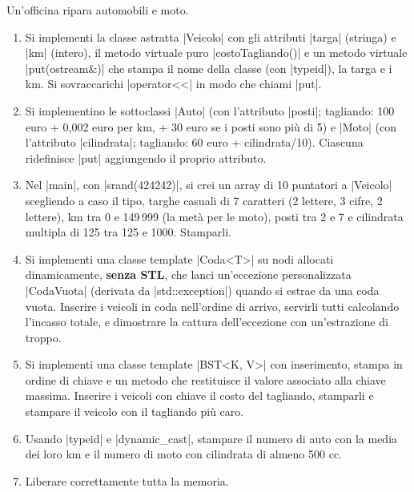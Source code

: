 \begin{traccia}[: L'officina]
Un'officina ripara automobili e moto.
\begin{enumerate}[label=\textbf{\Alph*.}]
  \item Si implementi la classe astratta \cc|Veicolo| con gli attributi \cc|targa|
        (stringa) e \cc|km| (intero), il metodo virtuale puro \cc|costoTagliando()| e un
        metodo virtuale \cc|put(ostream&)| che stampa il nome della classe (con
        \cc|typeid|), la targa e i km. Si sovraccarichi \cc|operator<<| in modo che chiami
        \cc|put|.
  \item Si implementino le sottoclassi \cc|Auto| (con l'attributo \cc|posti|; tagliando:
        100 euro + 0{,}002 euro per km, + 30 euro se i posti sono più di 5) e \cc|Moto|
        (con l'attributo \cc|cilindrata|; tagliando: 60 euro + cilindrata/10). Ciascuna
        ridefinisce \cc|put| aggiungendo il proprio attributo.
  \item Nel \cc|main|, con \cc|srand(424242)|, si crei un array di 10 puntatori a
        \cc|Veicolo| scegliendo a caso il tipo, targhe casuali di 7 caratteri (2 lettere, 3
        cifre, 2 lettere), km tra 0 e 149\,999 (la metà per le moto), posti tra 2 e 7 e
        cilindrata multipla di 125 tra 125 e 1000. Stamparli.
  \item Si implementi una classe template \cc|Coda<T>| su nodi allocati dinamicamente,
        \textbf{senza STL}, che lanci un'eccezione personalizzata \cc|CodaVuota| (derivata
        da \cc|std::exception|) quando si estrae da una coda vuota. Inserire i veicoli in
        coda nell'ordine di arrivo, servirli tutti calcolando l'incasso totale, e
        dimostrare la cattura dell'eccezione con un'estrazione di troppo.
  \item Si implementi una classe template \cc|BST<K, V>| con inserimento, stampa in ordine
        di chiave e un metodo che restituisce il valore associato alla chiave massima.
        Inserire i veicoli con chiave il costo del tagliando, stamparli e stampare il
        veicolo con il tagliando più caro.
  \item Usando \cc|typeid| e \cc|dynamic_cast|, stampare il numero di auto con la media dei
        loro km e il numero di moto con cilindrata di almeno 500 cc.
  \item Liberare correttamente tutta la memoria.
\end{enumerate}
\end{traccia}

